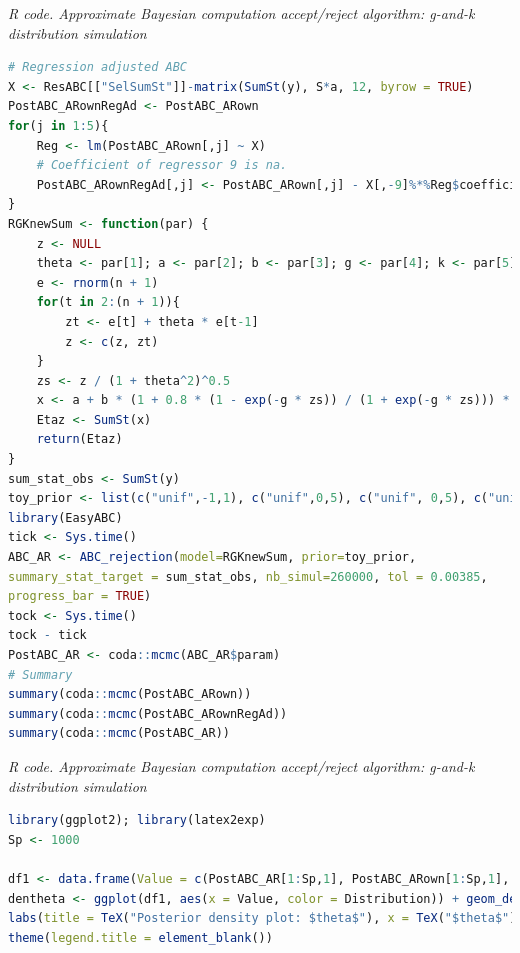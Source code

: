 \begin{enumerate}[leftmargin=*]
\begin{tcolorbox}[enhanced,width=4.67in,center upper,
	fontupper=\large\bfseries,drop shadow southwest,sharp corners]
	\textit{R code. Approximate Bayesian computation accept/reject algorithm: g-and-k distribution simulation}
	\begin{VF}
		\begin{lstlisting}[language=R]
# Regression adjusted ABC
X <- ResABC[["SelSumSt"]]-matrix(SumSt(y), S*a, 12, byrow = TRUE)
PostABC_ARownRegAd <- PostABC_ARown
for(j in 1:5){
	Reg <- lm(PostABC_ARown[,j] ~ X)
	# Coefficient of regressor 9 is na.
	PostABC_ARownRegAd[,j] <- PostABC_ARown[,j] - X[,-9]%*%Reg$coefficients[-c(1,9)]
}
RGKnewSum <- function(par) {
	z <- NULL
	theta <- par[1]; a <- par[2]; b <- par[3]; g <- par[4]; k <- par[5]
	e <- rnorm(n + 1)
	for(t in 2:(n + 1)){
		zt <- e[t] + theta * e[t-1]
		z <- c(z, zt)
	}
	zs <- z / (1 + theta^2)^0.5
	x <- a + b * (1 + 0.8 * (1 - exp(-g * zs)) / (1 + exp(-g * zs))) * (1 + zs^2)^k * zs
	Etaz <- SumSt(x)
	return(Etaz)
}
sum_stat_obs <- SumSt(y)
toy_prior <- list(c("unif",-1,1), c("unif",0,5), c("unif", 0,5), c("unif", -5,5), c("unif", -0.5,5))
library(EasyABC)
tick <- Sys.time()
ABC_AR <- ABC_rejection(model=RGKnewSum, prior=toy_prior,
summary_stat_target = sum_stat_obs, nb_simul=260000, tol = 0.00385,
progress_bar = TRUE)
tock <- Sys.time()
tock - tick
PostABC_AR <- coda::mcmc(ABC_AR$param)
# Summary
summary(coda::mcmc(PostABC_ARown))
summary(coda::mcmc(PostABC_ARownRegAd))
summary(coda::mcmc(PostABC_AR))
\end{lstlisting}
	\end{VF}
\end{tcolorbox}

\begin{tcolorbox}[enhanced,width=4.67in,center upper,
	fontupper=\large\bfseries,drop shadow southwest,sharp corners]
	\textit{R code. Approximate Bayesian computation accept/reject algorithm: g-and-k distribution simulation}
	\begin{VF}
		\begin{lstlisting}[language=R]
library(ggplot2); library(latex2exp)
Sp <- 1000

df1 <- data.frame(Value = c(PostABC_AR[1:Sp,1], PostABC_ARown[1:Sp,1], PostABC_ARownRegAd[1:Sp,1]), Distribution = factor(c(rep("EasyABC", Sp), rep("ABC", Sp), rep("ABCAdj", Sp))))
dentheta <- ggplot(df1, aes(x = Value, color = Distribution)) + geom_density(linewidth = 1) + geom_vline(xintercept = theta1, linetype = "dashed", color = "red", linewidth = 1) +
labs(title = TeX("Posterior density plot: $theta$"), x = TeX("$theta$"), y = "Posterior density") + scale_color_manual(values = c("blue", "red", "green")) +  theme_minimal() +
theme(legend.title = element_blank())


\end{lstlisting}
\end{VF}
\end{tcolorbox}
\end{enumerate}
